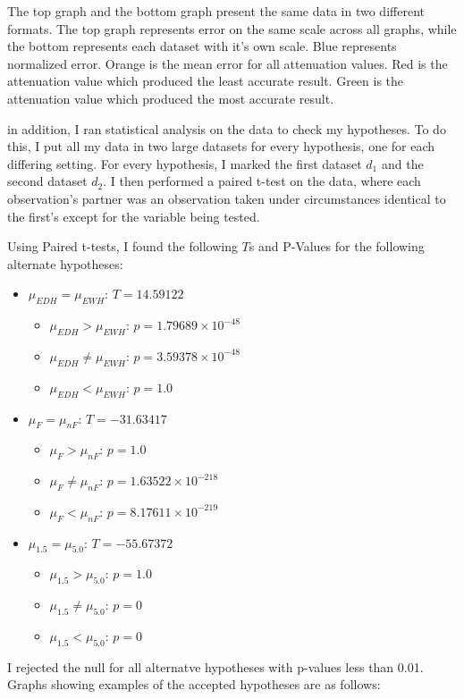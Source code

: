 \documentclass{beamer}
\begin{document}
\begin{frame}
  The top graph and the bottom graph present the same data in two different formats. The top graph represents error on the same scale across all graphs, while the bottom represents each dataset with it's own scale. Blue represents normalized error. Orange is the mean error for all attenuation values. Red is the attenuation value which produced the least accurate result. Green is the attenuation value which produced the most accurate result.
\end{frame}

\begin{frame}
  in addition, I ran statistical analysis on the data to check my hypotheses. To do this, I put all my data in two large datasets for every hypothesis, one for each differing setting. For every hypothesis, I marked the first dataset $d_{1}$ and the second dataset $d_{2}$. I then performed a paired t-test on the data, where each observation's partner was an observation taken under circumstances identical to the first's except for the variable being tested. 
\end{frame}

\begin{frame}
\end{frame}

\begin{frame}
  Using Paired t-tests, I found the following $T$s and P-Values for the following alternate hypotheses:
  \begin{itemize}
  \item $\mu_{EDH}=\mu_{EWH}$: $T=14.59122$
    \begin{itemize}
    \item $\mu_{EDH}>\mu_{EWH}$: $p=1.79689\times10^{-48}$
    \item $\mu_{EDH}\neq\mu_{EWH}$: $p=3.59378\times10^{-48}$
    \item $\mu_{EDH}<\mu_{EWH}$: $p=1.0$
    \end{itemize}  
  \item $\mu_{F}=\mu_{nF}$: $T=-31.63417$
    \begin{itemize}
    \item $\mu_{F}>\mu_{nF}$: $p=1.0$
    \item $\mu_{F}\neq\mu_{nF}$: $p=1.63522\times10^{-218}$
    \item $\mu_{F}<\mu_{nF}$: $p=8.17611\times10^{-219}$
    \end{itemize}
  \item $\mu_{1.5}=\mu_{5.0}$: $T=-55.67372$
    \begin{itemize}
    \item $\mu_{1.5}>\mu_{5.0}$: $p=1.0$
    \item $\mu_{1.5}\neq\mu_{5.0}$: $p=0$
    \item $\mu_{1.5}<\mu_{5.0}$: $p=0$
    \end{itemize}
  \end{itemize}
  
  I rejected the null for all alternatve hypotheses with p-values less than 0.01. Graphs showing examples of the accepted hypotheses are as follows:
\end{frame}
\end{document}
